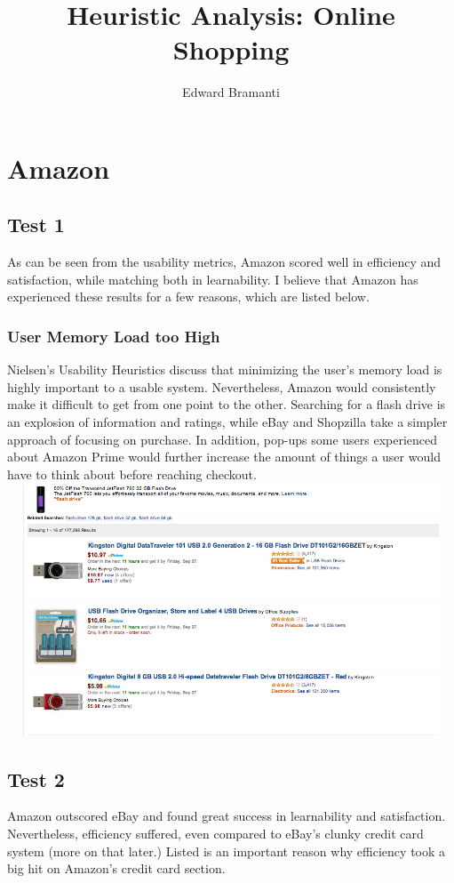 \documentclass[11pt, oneside]{article}   	%
\title{Heuristic Analysis: Online Shopping}
\author{Edward Bramanti}
\begin{document}
\maketitle
\section{Amazon}
\subsection{Test 1}
As can be seen from the usability metrics, Amazon scored well in efficiency and satisfaction, while matching both in learnability. I believe that Amazon has experienced these results for a few reasons, which are listed below.
\subsubsection{User Memory Load too High}
Nielsen's Usability Heuristics discuss that minimizing the user's memory load is highly important to a usable system. Nevertheless, Amazon would consistently make it difficult to get from one point to the other. Searching for a flash drive is an explosion of information and ratings, while eBay and Shopzilla take a simpler approach of focusing on purchase. In addition, pop-ups some users experienced about Amazon Prime would further increase the amount of things a user would have to think about before reaching checkout.
\includegraphics[width=6in, height=2.96in]{Amazon1}
\subsection{Test 2}
Amazon outscored eBay and found great success in learnability and satisfaction. Nevertheless, efficiency suffered, even compared to eBay's clunky credit card system (more on that later.) Listed is an important reason why efficiency took a big hit on Amazon's credit card section.
\end{document}
